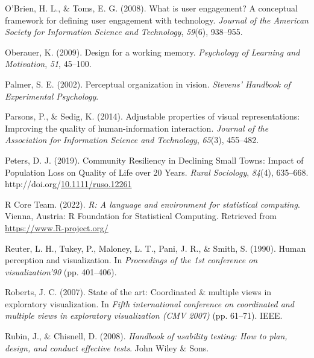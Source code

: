 \documentclass[print]{nuthesis}
\newlength{\cslhangindent}
\newenvironment{CSLReferences}[2]%
{\setlength{\parindent}{0pt}%
\everypar{\setlength{\hangindent}{\cslhangindent}}\ignorespaces}%
{\par}
\begin{document}
\begin{CSLReferences}{1}{0}
\leavevmode{}%
O'Brien, H. L., \& Toms, E. G. (2008). What is user engagement? A conceptual framework for defining user engagement with technology. \emph{Journal of the American Society for Information Science and Technology}, \emph{59}(6), 938--955.

\leavevmode{}%
Oberauer, K. (2009). Design for a working memory. \emph{Psychology of Learning and Motivation}, \emph{51}, 45--100.

\leavevmode{}%
Palmer, S. E. (2002). Perceptual organization in vision. \emph{Stevens' Handbook of Experimental Psychology}.

\leavevmode{}%
Parsons, P., \& Sedig, K. (2014). Adjustable properties of visual representations: Improving the quality of human-information interaction. \emph{Journal of the Association for Information Science and Technology}, \emph{65}(3), 455--482.

\leavevmode{}%
Peters, D. J. (2019). Community {Resiliency} in {Declining} {Small} {Towns}: {Impact} of {Population} {Loss} on {Quality} of {Life} over 20 {Years}. \emph{Rural Sociology}, \emph{84}(4), 635--668. http://doi.org/\href{https://doi.org/10.1111/ruso.12261}{10.1111/ruso.12261}

\leavevmode{}%
R Core Team. (2022). \emph{R: A language and environment for statistical computing}. Vienna, Austria: R Foundation for Statistical Computing. Retrieved from \url{https://www.R-project.org/}

\leavevmode{}%
Reuter, L. H., Tukey, P., Maloney, L. T., Pani, J. R., \& Smith, S. (1990). Human perception and visualization. In \emph{Proceedings of the 1st conference on visualization'90} (pp. 401--406).

\leavevmode{}%
Roberts, J. C. (2007). State of the art: Coordinated \& multiple views in exploratory visualization. In \emph{Fifth international conference on coordinated and multiple views in exploratory visualization (CMV 2007)} (pp. 61--71). IEEE.

\leavevmode{}%
Rubin, J., \& Chisnell, D. (2008). \emph{Handbook of usability testing: How to plan, design, and conduct effective tests}. John Wiley \& Sons.


\end{CSLReferences}
\end{document}
